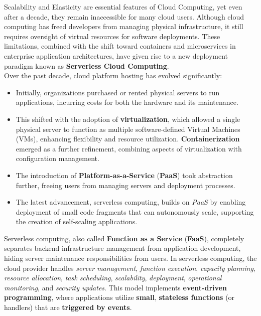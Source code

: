 Scalability and Elasticity are essential features of Cloud Computing, yet even after a decade, they remain inaccessible for many cloud users. Although cloud computing has freed developers from managing physical infrastructure, it still requires oversight of virtual resources for software deployments. These limitations, combined with the shift toward containers and microservices in enterprise application architectures, have given rise to a new deployment paradigm known as \textbf{Serverless Cloud Computing}\cite{banaei2022etas}.\vspace{14pt}\\
Over the past decade, cloud platform hosting has evolved significantly\cite{djemame2020open}:
\begin{itemize}
    \item Initially, organizations purchased or rented physical servers to run applications, incurring costs for both the hardware and its maintenance.
    \item This shifted with the adoption of \textbf{virtualization}, which allowed a single physical server to function as multiple software-defined Virtual Machines (VMs), enhancing flexibility and resource utilization. \textbf{Containerization} emerged as a further refinement, combining aspects of virtualization with configuration management.
    \item The introduction of \textbf{Platform-as-a-Service} (\textbf{PaaS}) took abstraction further, freeing users from managing servers and deployment processes.
    \item The latest advancement, serverless computing, builds on \textit{PaaS} by enabling deployment of small code fragments that can autonomously scale, supporting the creation of self-scaling applications.
\end{itemize}
Serverless computing, also called \textbf{Function as a Service} (\textbf{FaaS}), completely separates backend infrastructure management from application development, hiding server maintenance responsibilities from users. In serverless computing, the cloud provider handles \textit{server management}, \textit{function execution}, \textit{capacity planning}, \textit{resource allocation}, \textit{task scheduling}, \textit{scalability}, \textit{deployment}, \textit{operational monitoring}, and \textit{security updates}. This model implements \textbf{event-driven programming}, where applications utilize \textbf{small}, \textbf{stateless functions} (or handlers) that are \textbf{triggered by events}.\\
